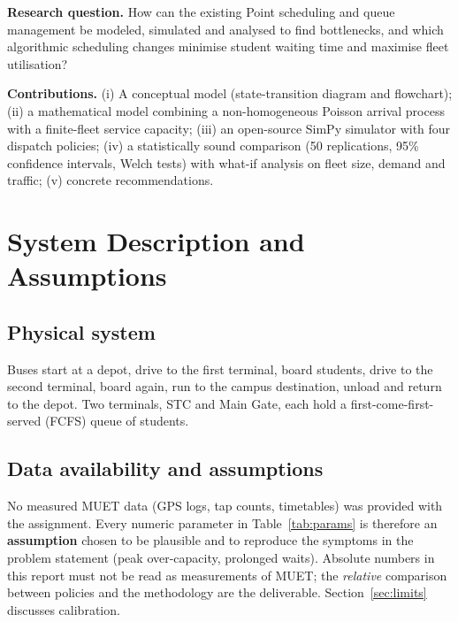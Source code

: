 \documentclass[conference]{IEEEtran}
\begin{document}
\textbf{Research question.} How can the existing Point scheduling and queue management be modeled, simulated and analysed to find bottlenecks, and which algorithmic scheduling changes minimise student waiting time and maximise fleet utilisation?

\textbf{Contributions.} (i) A conceptual model (state-transition diagram and flowchart); (ii) a mathematical model combining a non-homogeneous Poisson arrival process with a finite-fleet service capacity; (iii) an open-source SimPy simulator with four dispatch policies; (iv) a statistically sound comparison (50 replications, 95\% confidence intervals, Welch tests) with what-if analysis on fleet size, demand and traffic; (v) concrete recommendations.

\section{System Description and Assumptions}
\subsection{Physical system}
Buses start at a depot, drive to the first terminal, board students, drive to the second terminal, board again, run to the campus destination, unload and return to the depot. Two terminals, STC and Main Gate, each hold a first-come-first-served (FCFS) queue of students.

\subsection{Data availability and assumptions}
No measured MUET data (GPS logs, tap counts, timetables) was provided with the assignment. Every numeric parameter in Table~\ref{tab:params} is therefore an \textbf{assumption} chosen to be plausible and to reproduce the symptoms in the problem statement (peak over-capacity, prolonged waits). Absolute numbers in this report must not be read as measurements of MUET; the \emph{relative} comparison between policies and the methodology are the deliverable. Section~\ref{sec:limits} discusses calibration.
\end{document}
